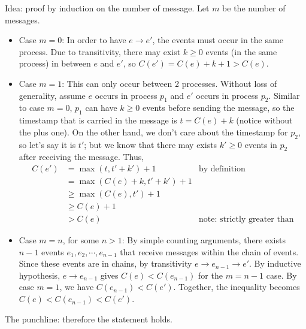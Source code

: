Idea: proof by induction on the number of message. Let $m$ be the number of messages.

\begin{itemize}
\item
Case $m = 0$:
In order to have $e \rightarrow e'$, the events must occur in the same process.
Due to transitivity, there may exist $k \ge 0$ events (in the same process) in between $e$ and $e'$, so $C(e') = C(e) + k+1 > C(e)$.
\item
Case $m = 1$:
This can only occur between 2 processes.
Without loss of generality, assume $e$ occurs in process $p_1$ and $e'$ occurs in process $p_2$.
Similar to case $m=0$, $p_1$ can have $k \ge 0$ events before sending the message, so the timestamp that is carried in the message is $t = C(e) + k$ (notice without the plus one).
On the other hand, we don't care about the timestamp for $p_2$, so let's say it is $t'$; but we know that there may exists $k' \ge 0$ events in $p_2$ after receiving the message.
Thus,
\begin{align*}
C(e') &= \max(t, t' + k') + 1 & \text{by definition} \\
	&= \max(C(e) + k, t' + k') + 1 \\
	&\ge \max(C(e), t') + 1 \\
	&\ge C(e) + 1 \\
	&> C(e) & \text{note: strictly greater than}
\end{align*}
\item
Case $m = n$, for some $n > 1$:
By simple counting arguments, there exists $n-1$ events $e_1, e_2, \cdots, e_{n-1}$ that receive messages within the chain of events.
Since these events are in chains, by transitivity $e \rightarrow e_{n-1} \rightarrow e'$.
By inductive hypothesis, $e \rightarrow e_{n-1}$ gives $C(e) < C(e_{n-1})$ for the $m = n-1$ case.
By case $m = 1$, we have $C(e_{n-1}) < C(e')$.
Together, the inequality becomes $C(e) < C(e_{n-1}) < C(e')$.
\end{itemize}
The punchline: therefore the statement holds.
\done
